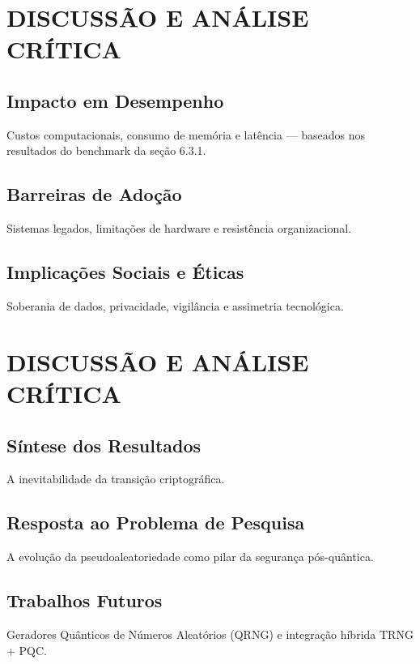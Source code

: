 \documentclass[
	12pt,				%
	openright,			%
	oneside,			%
	a4paper,			%
	portuguese,			%
	brazil				%
	]{abntex2}
\begin{document}
\chapter{DISCUSSÃO E ANÁLISE CRÍTICA} %

\section{Impacto em Desempenho}

Custos computacionais, consumo de memória e latência — baseados nos resultados do benchmark da seção 6.3.1.

\section{Barreiras de Adoção}

Sistemas legados, limitações de hardware e resistência organizacional.

\section{Implicações Sociais e Éticas}

Soberania de dados, privacidade, vigilância e assimetria tecnológica.

\chapter{DISCUSSÃO E ANÁLISE CRÍTICA} %

\section{Síntese dos Resultados}

A inevitabilidade da transição criptográfica.

\section{Resposta ao Problema de Pesquisa}

A evolução da pseudoaleatoriedade como pilar da segurança pós-quântica.

\section{Trabalhos Futuros}

Geradores Quânticos de Números Aleatórios (QRNG) e integração híbrida TRNG + PQC.
\end{document}

